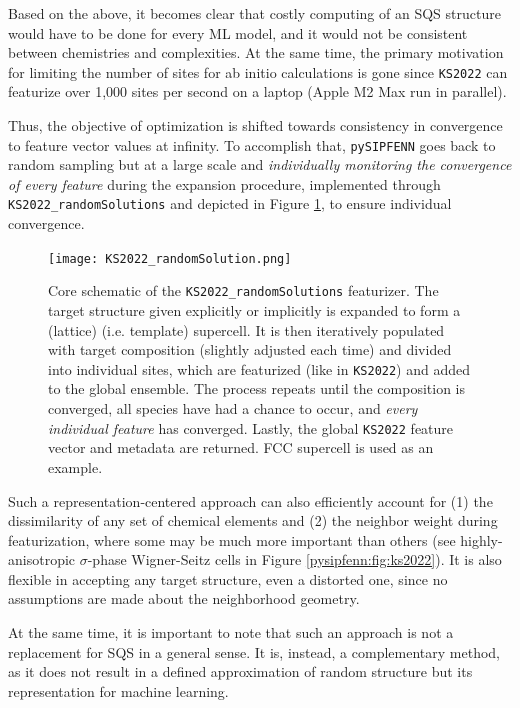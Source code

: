Based on the above, it becomes clear that costly computing of an SQS structure would have to be done for every ML model, and it would not be consistent between chemistries and complexities. At the same time, the primary motivation for limiting the number of sites for ab initio calculations is gone since \texttt{KS2022} can featurize over 1,000 sites per second on a laptop (Apple M2 Max run in parallel). 

Thus, the objective of optimization is shifted towards consistency in convergence to feature vector values at infinity. To accomplish that, \texttt{pySIPFENN} goes back to random sampling but at a large scale and \emph{individually monitoring the convergence of every feature} during the expansion procedure, implemented through \texttt{KS2022\_randomSolutions} and depicted in Figure \ref{pysipfenn:fig:KS2022randomSolution}, to ensure individual convergence. 


\begin{figure}[h]
    \centering
    \texttt{[image: KS2022\_randomSolution.png]}
    \caption{
    Core schematic of the \texttt{KS2022\_randomSolutions} featurizer. The target structure given explicitly or implicitly is expanded to form a (lattice) (i.e. template) supercell. It is then iteratively populated with target composition (slightly adjusted each time) and divided into individual sites, which are featurized (like in \texttt{KS2022}) and added to the global ensemble. The process repeats until the composition is converged, all species have had a chance to occur, and \emph{every individual feature} has converged. Lastly, the global \texttt{KS2022} feature vector and metadata are returned. FCC supercell is used as an example.
    }
    \label{pysipfenn:fig:KS2022randomSolution}
\end{figure}

Such a representation-centered approach can also efficiently account for (1) the dissimilarity of any set of chemical elements and (2) the neighbor weight during featurization, where some may be much more important than others (see highly-anisotropic $\sigma$-phase Wigner-Seitz cells in Figure \ref{pysipfenn:fig:ks2022}). It is also flexible in accepting any target structure, even a distorted one, since no assumptions are made about the neighborhood geometry.

At the same time, it is important to note that such an approach is not a replacement for SQS in a general sense. It is, instead, a complementary method, as it does not result in a defined approximation of random structure but its representation for machine learning.

